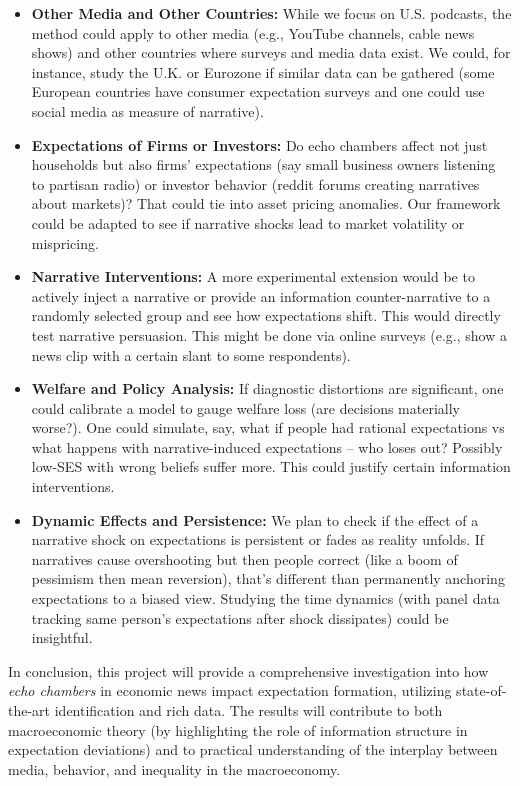 \documentclass[12pt]{article}
\begin{document}
\begin{itemize}
    \item \textbf{Other Media and Other Countries:} While we focus on U.S. podcasts, the method could apply to other media (e.g., YouTube channels, cable news shows) and other countries where surveys and media data exist. We could, for instance, study the U.K. or Eurozone if similar data can be gathered (some European countries have consumer expectation surveys and one could use social media as measure of narrative).
    \item \textbf{Expectations of Firms or Investors:} Do echo chambers affect not just households but also firms' expectations (say small business owners listening to partisan radio) or investor behavior (reddit forums creating narratives about markets)? That could tie into asset pricing anomalies. Our framework could be adapted to see if narrative shocks lead to market volatility or mispricing.
    \item \textbf{Narrative Interventions:} A more experimental extension would be to actively inject a narrative or provide an information counter-narrative to a randomly selected group and see how expectations shift. This would directly test narrative persuasion. This might be done via online surveys (e.g., show a news clip with a certain slant to some respondents).
    \item \textbf{Welfare and Policy Analysis:} If diagnostic distortions are significant, one could calibrate a model to gauge welfare loss (are decisions materially worse?). One could simulate, say, what if people had rational expectations vs what happens with narrative-induced expectations – who loses out? Possibly low-SES with wrong beliefs suffer more. This could justify certain information interventions.
    \item \textbf{Dynamic Effects and Persistence:} We plan to check if the effect of a narrative shock on expectations is persistent or fades as reality unfolds. If narratives cause overshooting but then people correct (like a boom of pessimism then mean reversion), that's different than permanently anchoring expectations to a biased view. Studying the time dynamics (with panel data tracking same person's expectations after shock dissipates) could be insightful.
\end{itemize}

In conclusion, this project will provide a comprehensive investigation into how \emph{echo chambers} in economic news impact expectation formation, utilizing state-of-the-art identification and rich data. The results will contribute to both macroeconomic theory (by highlighting the role of information structure in expectation deviations) and to practical understanding of the interplay between media, behavior, and inequality in the macroeconomy.

\vfill \pagebreak


\end{document}
